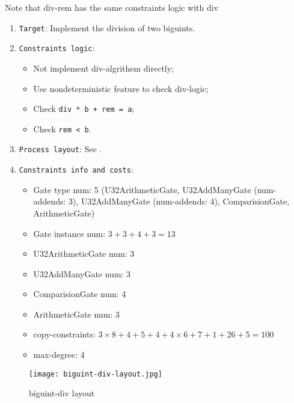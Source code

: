 
\hspace*{\fill}

Note that div-rem has the same constraints logic with div

\begin{enumerate}
    \item \verb|Target|: Implement the division of two biguints.
    \item \verb|Constraints logic|:
    \begin{itemize}
        \item Not implement div-algrithem directly;
        \item Use nondeterministic feature to check div-logic;
        \item Check \verb|div * b + rem = a|;
        \item Check \verb|rem < b|.
    \end{itemize}
    \item \verb|Process layout|: See .
    \item \verb|Constraints info and costs|:
    \begin{itemize}
        \item Gate type num: 5 (U32ArithmeticGate, U32AddManyGate (num-addends: 3), U32AddManyGate (num-addends: 4), ComparisionGate, ArithmeticGate)
        \item Gate instance num: $3 + 3 + 4 + 3 = 13$
        \item U32ArithmeticGate num: 3
        \item U32AddManyGate num: 3
        \item ComparisionGate num: 4
        \item ArithmeticGate num: 3
        \item copy-constraints: $3 \times 8 + 4 + 5 + 4 + 4 \times 6 + 7 + 1 + 26 + 5 = 100$
        \item max-degree: 4
    \end{itemize}
\end{enumerate}

\begin{figure}[!ht]
    \centering
    \texttt{[image: biguint-div-layout.jpg]}
    \caption{biguint-div layout}
    \label{fig:biguint-div-layout}
\end{figure}
